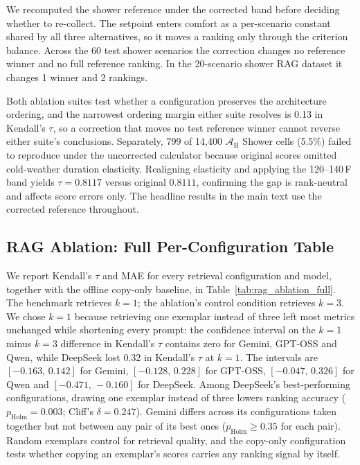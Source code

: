 \documentclass[11pt]{article}
\begin{document}
We recomputed the shower reference under the corrected band before deciding whether to re-collect. The setpoint enters comfort as a per-scenario constant shared by all three alternatives, so it moves a ranking only through the criterion balance. Across the 60 test shower scenarios the correction changes no reference winner and no full reference ranking. In the 20-scenario shower RAG dataset it changes 1 winner and 2 rankings. 

Both ablation suites test whether a configuration preserves the architecture ordering, and the narrowest ordering margin either suite resolves is 0.13 in Kendall's $\tau$, so a correction that moves no test reference winner cannot reverse either suite's conclusions. Separately, 799 of 14,400 $\mathcal{A}_{\text{H}}$ Shower cells (5.5\%) failed to reproduce under the uncorrected calculator because original scores omitted cold-weather duration elasticity. Realigning elasticity and applying the 120--140\,\textdegree{}F band yields $\tau = 0.8117$ versus original $0.8111$, confirming the gap is rank-neutral and affects score errors only. The headline results in the main text use the corrected reference throughout.

\subsection{RAG Ablation: Full Per-Configuration Table}
\label{app:rag_ablation_full}

We report Kendall's $\tau$ and MAE for every retrieval configuration and model, together with the offline copy-only baseline, in Table~\ref{tab:rag_ablation_full}. The benchmark retrieves $k=1$; the ablation's control condition retrieves $k=3$. We chose $k=1$ because retrieving one exemplar instead of three left most metrics unchanged while shortening every prompt: the confidence interval on the $k=1$ minus $k=3$ difference in Kendall's $\tau$ contains zero for Gemini, GPT-OSS and Qwen, while DeepSeek lost 0.32 in Kendall's $\tau$ at $k=1$. The intervals are $[-0.163,\,0.142]$ for Gemini, $[-0.128,\,0.228]$ for GPT-OSS, $[-0.047,\,0.326]$ for Qwen and $[-0.471,\,-0.160]$ for DeepSeek. Among DeepSeek's best-performing configurations, drawing one exemplar instead of three lowers ranking accuracy ($p_{\text{Holm}} = 0.003$; Cliff's $\delta = 0.247$). Gemini differs across its configurations taken together but not between any pair of its best ones ($p_{\text{Holm}} \geq 0.35$ for each pair). Random exemplars control for retrieval quality, and the copy-only configuration tests whether copying an exemplar's scores carries any ranking signal by itself.
\end{document}

